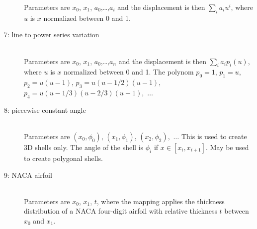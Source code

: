 \begin{description}
Parameters are $x_0$, $x_1$, $a_0$,\ldots,$a_i$
and the displacement is then $\sum_i a_i u^i$,
where $u$ is $x$ normalized between 0 and 1. 
\item[7: line to power series variation] \mbox{} \\	
Parameters are $x_0$, $x_1$, $a_0$,\ldots,$a_n$
and the displacement is then $\sum_i a_i p_i(u)$,
where $u$ is $x$ normalized between 0 and 1.
The polynom $p_0=1$, $p_1=u$, $p_2=u(u-1)$, 
$p_3=u(u-1/2)(u-1)$, $p_4=u(u-1/3)(u-2/3)(u-1)$,~$\ldots$
\item[8: piecewise constant angle] \mbox{} \\
Parameters are $(x_0,\phi_0)$, $(x_1,\phi_1)$, $(x_2,\phi_2)$,~$\ldots$
This is used to create 3D shells only. 
The angle of the shell is $\phi_i$ if $x \in [x_i,x_{i+1}]$. 
May be used to create polygonal shells.
\item[9: NACA airfoil] \mbox{} \\
Parameters are $x_0$, $x_1$, $t$, where the mapping applies the
thickness distribution of a NACA four-digit airfoil with relative
thickness $t$ between $x_0$ and $x_1$.

\end{description}

